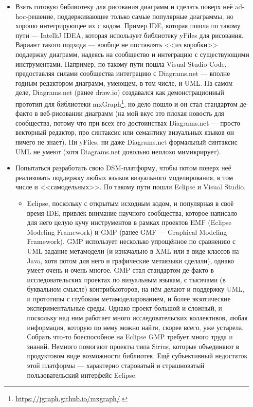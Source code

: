 \documentclass{text-style}
\begin{document}
\begin{itemize}
    \item Взять готовую библиотеку для рисования диаграмм и сделать поверх неё ad-hoc-решение, поддерживающее только самые популярные диаграммы, но хорошо интегрирующее их с кодом. Пример IDE, которая пошла по такому пути --- IntelliJ IDEA, которая использует библиотеку yFiles для рисования. Вариант такого подхода --- вообще не поставлять <<из коробки>> поддержку диаграмм, надеясь на сообщество и интеграцию с существующими инструментами. Например, по такому пути пошла Visual Studio Code, предоставляя силами сообщества интеграцию с Diagrams.net --- вполне годным редактором диаграмм, умеющем, в том числе, и UML. На самом деле, Diagrams.net (ранее draw.io) создавался как демонстрационный прототип для библиотеки mxGraph\footnote{\url{https://jgraph.github.io/mxgraph/}.}, но дело пошло и он стал стандартом де-факто в веб-рисовании диаграмм (на мой вкус это плохая новость для сообщества, потому что при всех его достоинствах Diagrams.net --- просто векторный редактор, про синтаксис или семантику визуальных языков он ничего не знает). Ни yFiles, ни даже Diagrams.net формальный синтаксис UML не умеют (хотя Diagrams.net довольно неплохо мимикрирует).
    \item Попытаться разработать свою DSM-платформу, чтобы потом поверх неё реализовать поддержку любых языков визуального моделирования, в том числе и <<самодельных>>. По такому пути пошли Eclipse и Visual Studio. 
    \begin{itemize}
        \item Eclipse, поскольку с открытым исходным кодом, и популярная в своё время IDE, привлёк внимание научного сообщества, которое написало для него целую кучу инструментов в рамках проектов EMF (Eclipse Modeling Framework) и GMP (ранее GMF --- Graphical Modeling Framework). GMP использует несколько упрощённое по сравнению с UML задание метамодели (и изначально в XML или в виде классов на Java, хотя потом для него и графические метаязыки сделали), однако умеет очень и очень многое. GMP стал стандартом де-факто в исследовательских проектах по визуальным языкам, с тысячами (в буквальном смысле) контрибьюторов, на нём делают и поддержку UML, и прототипы с глубоким метамоделированием, и более экзотические экспериментальные среды. Однако проект большой и сложный, и поскольку над ним работает много исследовательских коллективов, любая информация, которую по нему можно найти, скорее всего, уже устарела. Собрать что-то боеспособное на Eclipse GMP требует много труда и знаний. Немного помогают проекты типа Sirius, которые объединяют в продуктовом виде возможности библиотек. Ещё субъективный недостаток этой платформы --- характерно староватый и страшноватый пользовательский интерфейс Eclipse.

\end{itemize}
\end{itemize}
\end{document}
